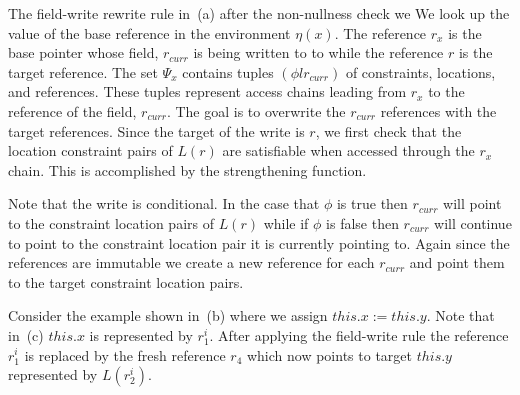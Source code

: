 The field-write rewrite rule in~(a) after the
non-nullness check we We look up the value of the base reference in
the environment $\eta(x)$.  The reference $r_x$ is the base pointer
whose field, $r_\mathit{curr}$ is being written to to while the
reference $r$ is the target reference. The set $\Psi_x$ contains
tuples $(\phi l r_\mathit{curr})$ of constraints, locations, and
references. These tuples represent access chains leading from $r_x$ to
the reference of the field, $r_\mathit{curr}$. The goal is to
overwrite the $r_\mathit{curr}$ references with the target
references. Since the target of the write is $r$, we first check that
the location constraint pairs of $L(r)$ are satisfiable when accessed
through the $r_x$ chain. This is accomplished by the strengthening
function.



Note that the write is conditional. In the case that $\phi$ is true
then $r_\mathit{curr}$ will point to the constraint location pairs of
$L(r)$ while if $\phi$ is false then $r_\mathit{curr}$ will continue
to point to the constraint location pair it is currently pointing to.
Again since the references are immutable we create a new reference for
each $r_\mathit{curr}$ and point them to the target constraint
location pairs.

Consider the example shown in~(b) where we assign
$\mathit{this}.x := \mathit{this}.y$. Note that
in~(c) $\mathit{this}.x$ is represented by
$r_1^i$. After applying the field-write rule the reference $r_1^i$ is
replaced by the fresh reference $r_4$ which now points to target
$\mathit{this}.y$ represented by $L(r_2^i)$.


\begin{comment}
\begin{figure}[t]
\begin{center}
\begin{tabular}[c]{l}
$\Psi_x = \{ (true, l_0, r_1^i) \}$\\
$ST (L, r_3^s, \phi, \phi_g)$ \\
$\theta = \{ (\phi_{2a}\; l_\mathit{null} ) (\phi_{2b}\; l_2) (\phi_{2c}\; l_1) \}$\\
$ST(L, r_0, \phi, \phi_g)$\\
$\theta = \{ \}$\\
\end{tabular}
\end{center}
\caption{FIXME: When will I get a caption}
\label{fig:faHeapSets}
\end{figure}
\end{comment}



